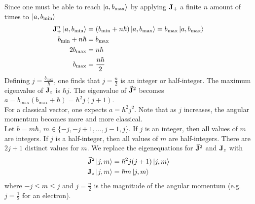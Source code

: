 \documentclass[12pt,a4paper,titlepage]{article}
\newcommand{\trm}[1]{\textrm{#1}} %
\begin{document}
Since one must be able to reach $\ket{a,b_{\trm{max}}}$ by applying $\vb{J}_{+}$ a finite $n$ amount of times to $\ket{a,b_{\trm{min}}}$
\begin{equation}
\begin{aligned}
\vb{J}_{+}^{n}\ket{a,b_{\trm{min}}}&=(b_{\trm{min}}+n\hbar)\ket{a,b_{\trm{max}}}=b_{\trm{max}}\ket{a,b_{\trm{max}}}\\
b_{\trm{min}}+n\hbar&=b_{\trm{max}}\\
2b_{\trm{max}}&=n\hbar\\
b_{\trm{max}}&=\frac{n\hbar}{2}
\end{aligned}
\end{equation}
Defining $j=\frac{b_{\trm{max}}}{\hbar}$, one finds that $j=\frac{n}{2}$ is an integer or half-integer. The maximum eigenvalue of $\vb{J}_{z}$ is $\hbar j$. The eigenvalue of $\vec{\vb{J}}^{2}$ becomes $a=b_{\trm{max}}(b_{\trm{max}}+\hbar)=\hbar^{2}j(j+1)$.\\

For a classical vector, one expects $a=\hbar^{2}j^{2}$. Note that as $j$ increases, the angular momentum becomes more and more classical.\\

Let $b=m\hbar$, $m\in\{-j,-j+1,\ldots,j-1,j\}$. If $j$ is an integer, then all values of $m$ are integers. If $j$ is a half-integer, then all values of $m$ are half-integers. There are $2j+1$ distinct values for $m$. We replace the eigenequations for $\vec{\vb{J}}^{2}$ and $\vb{J}_{z}$ with
\begin{equation}
\begin{aligned}
\vec{\vb{J}}^{2}\ket{j,m}&=\hbar^{2}j(j+1)\ket{j,m}\\
\vb{J}_{z}\ket{j,m}&=\hbar m\ket{j,m}
\end{aligned}
\end{equation}
where $-j\leq m\leq j$ and $j=\frac{n}{2}$ is the magnitude of the angular momentum (e.g. $j=\frac{1}{2}$ for an electron).\\
\end{document}
